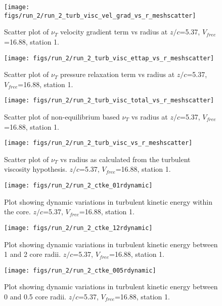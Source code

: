 \begin{figure}[H]
\centering
\texttt{[image: figs/run\_2/run\_2\_turb\_visc\_vel\_grad\_vs\_r\_meshscatter]}
\caption{Scatter plot of $\nu_T$ velocity gradient term vs radius at $z/c$=5.37, $V_{free}$=16.88, station 1.}
\end{figure}


\begin{figure}[H]
\centering
\texttt{[image: figs/run\_2/run\_2\_turb\_visc\_ettap\_vs\_r\_meshscatter]}
\caption{Scatter plot of $\nu_T$ pressure relaxation term vs radius at $z/c$=5.37, $V_{free}$=16.88, station 1.}
\end{figure}


\begin{figure}[H]
\centering
\texttt{[image: figs/run\_2/run\_2\_turb\_visc\_total\_vs\_r\_meshscatter]}
\caption{Scatter plot of non-equilibrium based $\nu_T$ vs radius at $z/c$=5.37, $V_{free}$=16.88, station 1.}
\end{figure}


\begin{figure}[H]
\centering
\texttt{[image: figs/run\_2/run\_2\_turb\_visc\_vs\_r\_meshscatter]}
\caption{Scatter plot of $\nu_T$ vs radius as calculated from the turbulent viscosity hypothesis. $z/c$=5.37, $V_{free}$=16.88, station 1.}
\end{figure}


\begin{figure}[H]
\centering
\texttt{[image: figs/run\_2/run\_2\_ctke\_01rdynamic]}
\caption{Plot showing dynamic variations in turbulent kinetic energy within the core. $z/c$=5.37, $V_{free}$=16.88, station 1.}
\end{figure}


\begin{figure}[H]
\centering
\texttt{[image: figs/run\_2/run\_2\_ctke\_12rdynamic]}
\caption{Plot showing dynamic variations in turbulent kinetic energy between 1 and 2 core radii. $z/c$=5.37, $V_{free}$=16.88, station 1.}
\end{figure}


\begin{figure}[H]
\centering
\texttt{[image: figs/run\_2/run\_2\_ctke\_005rdynamic]}
\caption{Plot showing dynamic variations in turbulent kinetic energy between 0 and 0.5 core radii. $z/c$=5.37, $V_{free}$=16.88, station 1.}
\end{figure}


